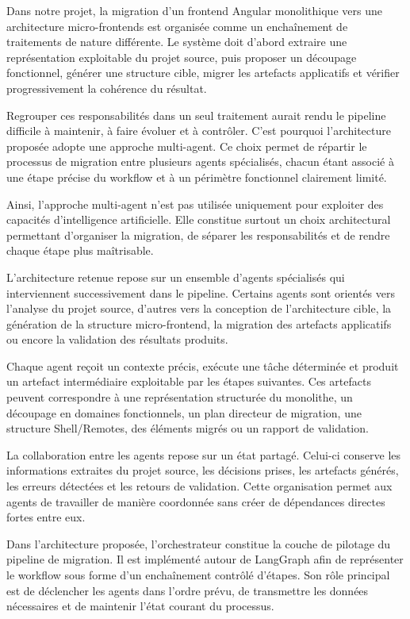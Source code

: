 Dans notre projet, la migration d'un frontend Angular monolithique vers une architecture micro-frontends est organisée comme un enchaînement de traitements de nature différente. Le système doit d'abord extraire une représentation exploitable du projet source, puis proposer un découpage fonctionnel, générer une structure cible, migrer les artefacts applicatifs et vérifier progressivement la cohérence du résultat.

Regrouper ces responsabilités dans un seul traitement aurait rendu le pipeline difficile à maintenir, à faire évoluer et à contrôler. C'est pourquoi l'architecture proposée adopte une approche multi-agent. Ce choix permet de répartir le processus de migration entre plusieurs agents spécialisés, chacun étant associé à une étape précise du workflow et à un périmètre fonctionnel clairement limité.

Ainsi, l'approche multi-agent n'est pas utilisée uniquement pour exploiter des capacités d'intelligence artificielle. Elle constitue surtout un choix architectural permettant d'organiser la migration, de séparer les responsabilités et de rendre chaque étape plus maîtrisable.

L'architecture retenue repose sur un ensemble d'agents spécialisés qui interviennent successivement dans le pipeline. Certains agents sont orientés vers l'analyse du projet source, d'autres vers la conception de l'architecture cible, la génération de la structure micro-frontend, la migration des artefacts applicatifs ou encore la validation des résultats produits.

Chaque agent reçoit un contexte précis, exécute une tâche déterminée et produit un artefact intermédiaire exploitable par les étapes suivantes. Ces artefacts peuvent correspondre à une représentation structurée du monolithe, un découpage en domaines fonctionnels, un plan directeur de migration, une structure Shell/Remotes, des éléments migrés ou un rapport de validation.

La collaboration entre les agents repose sur un état partagé. Celui-ci conserve les informations extraites du projet source, les décisions prises, les artefacts générés, les erreurs détectées et les retours de validation. Cette organisation permet aux agents de travailler de manière coordonnée sans créer de dépendances directes fortes entre eux.

Dans l'architecture proposée, l'orchestrateur constitue la couche de pilotage du pipeline de migration. Il est implémenté autour de LangGraph afin de représenter le workflow sous forme d'un enchaînement contrôlé d'étapes. Son rôle principal est de déclencher les agents dans l'ordre prévu, de transmettre les données nécessaires et de maintenir l'état courant du processus.

